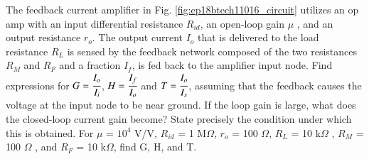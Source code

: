 
The feedback current amplifier in Fig. \ref{fig:ep18btech11016_circuit} utilizes an op amp with an input differential resistance $R_{id}$, an open-loop gain $\mu$ , and an output resistance $r_o$. The output current $I_o$ that is delivered to the load resistance $R_L$ is sensed by the feedback network composed of the two resistances $R_M$ and $R_F$ and a fraction $I_f$, is fed back to the amplifier input node. Find expressions for $G = \cfrac{I_o}{I_i}$, $H = \cfrac{I_f}{I_o}$ and $T = \cfrac{I_o}{I_s}$, assuming that the feedback causes the voltage at the input node to be near ground. If the loop gain is large, what does the closed-loop current gain become? State precisely the condition under which this is obtained. For $\mu$ = $10^4$ V/V, $R_{id}$ = 1 M$\Omega$, $r_o$ = 100 $\Omega$, $R_L$ = 10 k$\Omega$ , $R_M$ = 100 $\Omega$ , and $R_F$ = 10 k$\Omega$, find G, H, and T.\\


